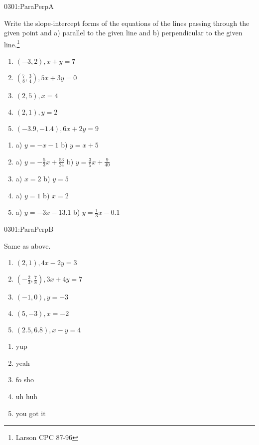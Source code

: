 \begin{defproblem}{0301:ParaPerpA}%
\begin{onlyproblem}%
\begin{exercise}
Write the slope-intercept forms of the equations of the lines
passing through the given point and a) parallel to the given
line and b) perpendicular to the given line.\footnote{Larson CPC
87-96}
\begin{enumerate}
\item $(-3,2), x+y=7$
\item $(\frac{7}{8},\frac{3}{4}), 5x+3y=0$
\item $(2,5), x=4$
\item $(2,1), y=2$
\item $(-3.9,-1.4), 6x+2y=9$
\end{enumerate}
\end{exercise}
\end{onlyproblem}

\begin{onlysolution}
\begin{enumerate}
\item a) $y=-x-1$ b) $y=x+5$
\item a) $y=-\frac{5}{3}x+\frac{53}{24}$ b) $y=\frac{3}{5}x+\frac{9}{40}$
\item a) $x=2$ b) $y=5$
\item a) $y=1$ b) $x=2$
\item a) $y=-3x-13.1$ b) $y=\frac{1}{3}x - 0.1$
\end{enumerate}
\end{onlysolution}
\end{defproblem}

\begin{defproblem}{0301:ParaPerpB}
\begin{onlyproblem}
\begin{exercise}
Same as above.
\begin{enumerate}
\item $(2,1), 4x-2y=3$
\item $(-\frac{2}{3},\frac{7}{8}), 3x+4y=7$
\item $(-1,0), y=-3$ 
\item $(5,-3), x=-2$
\item $(2.5,6.8), x-y=4$
\end{enumerate}
\end{exercise}
\end{onlyproblem}

\begin{onlysolution}
\begin{enumerate}
\item yup
\item yeah
\item fo sho
\item uh huh
\item you got it
\end{enumerate}
\end{onlysolution}
\end{defproblem}

